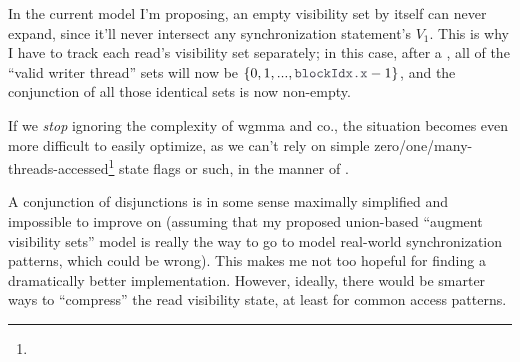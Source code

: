 \filbreak
In the current model I'm proposing, an empty visibility set by itself can never expand, since it'll never intersect any synchronization statement's $V_1$.
This is why I have to track each read's visibility set separately; in this case, after a , all of the ``valid writer thread'' sets will now be ${\{0, 1, ..., \lighttt{blockIdx.x} - 1}\}$, and the conjunction of all those identical sets is now non-empty.

\filbreak
If we \textit{stop} ignoring the complexity of wgmma and co., the situation becomes even more difficult to easily optimize, as we can't rely on simple zero/one/many-threads-accessed\footnote{} state flags or such, in the manner of .

\filbreak
A conjunction of disjunctions is in some sense maximally simplified and impossible to improve on (assuming that my proposed union-based ``augment visibility sets'' model is really the way to go to model real-world synchronization patterns, which could be wrong).
This makes me not too hopeful for finding a dramatically better implementation.
However, ideally, there would be smarter ways to ``compress'' the read visibility state, at least for common access patterns.


\filbreak
{}

